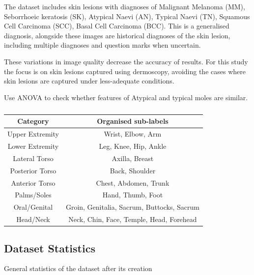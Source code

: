 The dataset includes skin lesions with diagnoses of Malignant Melanoma (MM), Seborrhoeic keratosis (SK), Atypical Naevi (AN), Typical Naevi (TN), Squamous Cell Carcinoma (SCC), Basal Cell Carcinoma (BCC). This is a generalised diagnosis, alongside these images are historical diagnoses of the skin lesion, including multiple diagnoses and question marks when uncertain.

These variations in image quality decrease the accuracy of results. For this study the focus is on skin lesions captured using dermoscopy, avoiding the cases where skin lesions are captured under less-adequate conditions.

Use ANOVA to check whether features of Atypical and typical moles are similar.


\begin{table}
	\small
	\begin{tabular}{|c|c|}
		\hline
		Category & Organised sub-labels
		\\
		\hline
		Upper Extremity & Wrist, Elbow, Arm
		\\
		\hline
		Lower Extremity & Leg, Knee, Hip, Ankle
		\\
		\hline
		Lateral Torso & Axilla, Breast
		\\
		\hline
		Posterior Torso & Back, Shoulder
		\\
		\hline
		Anterior Torso & Chest, Abdomen, Trunk
		\\
		Palms/Soles & Hand, Thumb, Foot
		\\
		\hline
		Oral/Genital & Groin, Genitalia, Sacrum, Buttocks, Sacrum
		\\
		\hline
		Head/Neck & Neck, Chin, Face, Temple, Head, Forehead
		\\
		\hline
	\end{tabular}
	\caption{}
\end{table} \label{nhs-location-names}





\subsection{Dataset Statistics}
General statistics of the dataset after its creation

